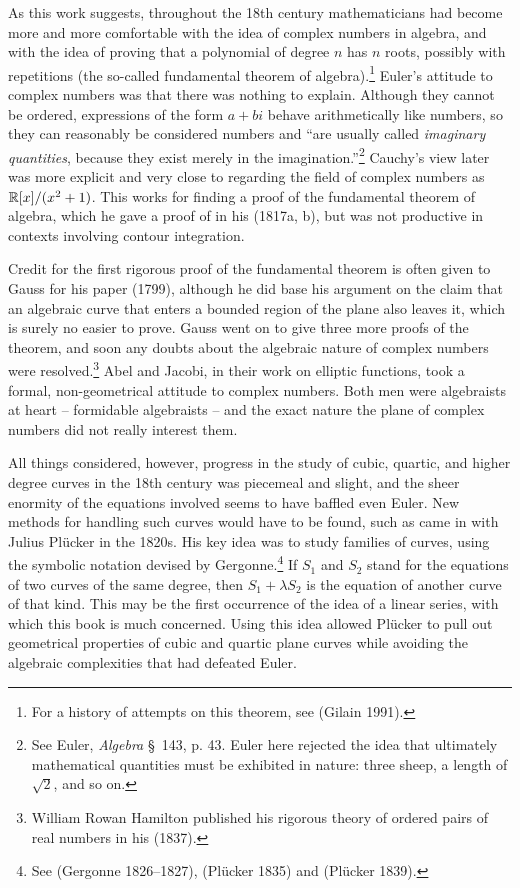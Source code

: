 As this work suggests, throughout the 18th century mathematicians had become more and more comfortable with the idea of complex numbers in algebra, and with the idea of proving that a polynomial of degree $n$ has $n$ roots, possibly with repetitions (the so-called fundamental theorem of algebra).\footnote{For a history of attempts on this theorem, see (Gilain 1991).} Euler's attitude to complex numbers was that there was nothing to explain. Although they cannot be ordered, expressions of the form $a+bi$  behave arithmetically like numbers, so they can reasonably be considered numbers  and ``are usually called \emph{imaginary quantities}, because they exist merely in the imagination.''\footnote{See Euler, \emph{Algebra} \S\, 143, p. 43. Euler here rejected the idea that ultimately mathematical quantities must be exhibited in nature: three sheep, a length of $\sqrt{2}$, and so on.} Cauchy's view later was more explicit and very close to regarding  the field of complex numbers as $\RR [x]/(x^2 + 1)$. This works for finding a proof of the fundamental theorem of algebra, which he gave a proof of in his (1817a, b), but was not productive in contexts involving contour integration. 

Credit for the first rigorous proof of the fundamental theorem is often given to Gauss for his paper (1799), although he did base his argument on the claim that an algebraic curve that enters a bounded region of the plane also leaves it,  which is surely no easier to prove.  Gauss went on to give three more proofs of the theorem, and soon any doubts about the algebraic nature of complex numbers were resolved.\footnote{William Rowan Hamilton published his rigorous theory of ordered pairs of real numbers in his (1837).} Abel and Jacobi, in their work  on elliptic functions, took a formal, non-geometrical attitude to complex numbers.  Both men were algebraists at heart -- formidable algebraists -- and the exact nature the plane of complex numbers did not really interest them. 

All things considered, however, progress in the study of cubic, quartic, and higher degree curves in the 18th century was piecemeal and slight, and the sheer enormity of the equations involved seems to have baffled even Euler. New methods for handling such curves would have to be found, such as came in with Julius Pl\"ucker in the 1820s. His key idea was to study families of curves, using the symbolic notation devised by Gergonne.\footnote{See  (Gergonne 1826--1827), (Pl\"ucker 1835) and (Pl\"ucker 1839).} If $S_1$ and $S_2$ stand for the equations of two curves of the same degree, then $S_1 + \lambda S_2$ is the equation of another curve of that kind. This may be the first occurrence of the idea of a linear series, with which this book is much concerned. Using this idea allowed Pl\"ucker to pull out geometrical properties of cubic and quartic plane curves while avoiding the algebraic complexities that had defeated Euler.  


